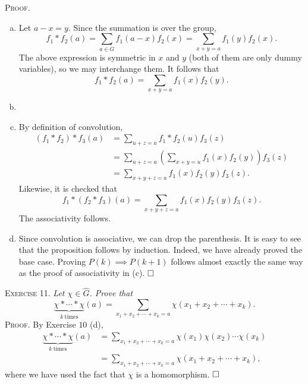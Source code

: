 \documentclass[11pt, leqno]{article}
\newcommand{\done}{\ensuremath{\hfill\square}}
\begin{document}
\textsc{Proof}. 
\begin{enumerate}[(a)]
\item Let $a-x = y$. Since the summation is over the group, 
\begin{displaymath}
f_1*f_2(a) = \sum_{a \in G} f_1(a-x) f_2(x) = \sum_{x+y = a}f_1(y)f_2(x).
\end{displaymath}
The above expression is symmetric in $x$ and $y$ (both of them are only dummy variables), so we may interchange them. It follows that 
\begin{displaymath}
f_1 * f_2 (a) = \sum_{x+y = a} f_1(x) f_2(y).
\end{displaymath} 
\item 
\item By definition of convolution, 
\begin{align*}
  (f_1 * f_2) * f_3 (a) &= \sum_{u + z = a} f_1*f_2(u) f_3(z) \\
                        &= \sum_{u + z = a} \left( \sum_{x+y = u} f_1(x)f_2(y) \right) f_3(z) \\
                        &= \sum_{x+y+z = a} f_1(x) f_2(y) f_3(z).
\end{align*}
Likewise, it is checked that 
\begin{displaymath}
  f_1 * (f_2 * f_3)(a) = \sum_{x+y+z = a} f_1(x) f_2(y) f_3(z).
\end{displaymath}
The associativity follows. 
\item Since convolution is associative, we can drop the parenthesis. It is easy to see that the proposition follows by induction. Indeed, we have already proved the base case. Proving $P(k) \implies P(k+1)$ follows almost exactly the same way as the proof of associativity in (c). \done
\end{enumerate}

\textsc{Exercise 11}. \emph{Let $\chi \in \widehat{G}$. Prove that 
\begin{displaymath}
\underbrace{\chi * \cdots * \chi}_{k\ \text{times}}(a) = \sum_{x_1 + x_2 + \cdots + x_k = a} \chi(x_1 + x_2 + \cdots + x_k).
\end{displaymath}}\textsc{Proof}. By Exercise $10$ (d), 
\begin{align*}
  \underbrace{\chi * \cdots * \chi}_{k\ \text{times}}(a) &= \sum_{x_1 + x_2 + \cdots + x_k = a} \chi(x_1) \chi(x_2) \cdots \chi(x_k) \\
  &= \sum_{x_1 + x_2 + \cdots + x_k = a} \chi(x_1 + x_2 + \cdots + x_k),
\end{align*}
where we have used the fact that $\chi$ is a homomorphism. \done
\end{document}

